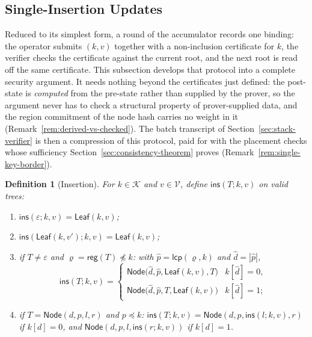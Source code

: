 \documentclass[11pt]{article}
\newtheorem{definition}{Definition}
\begin{document}
\subsection{Single-Insertion Updates}
\label{sec:single-key}

Reduced to its simplest form, a round of the accumulator records one binding: the operator submits $(k,v)$ together with a non-inclusion certificate for $k$, the verifier checks the certificate against the current root, and the next root is read off the same certificate. This subsection develops that protocol into a complete security argument. It needs nothing beyond the certificates just defined: the post-state is \emph{computed} from the pre-state rather than supplied by the prover, so the argument never has to check a structural property of prover-supplied data, and the region commitment of the node hash carries no weight in it (Remark~\ref{rem:derived-vs-checked}). The batch transcript of Section~\ref{sec:stack-verifier} is then a compression of this protocol, paid for with the placement checks whose sufficiency Section~\ref{sec:consistency-theorem} proves (Remark~\ref{rem:single-key-border}).

\begin{definition}[Insertion]
\label{def:insert}
For $k \in \mathcal{K}$ and $v \in \mathcal{V}$, define $\mathsf{ins}(T;k,v)$ on valid trees:
\begin{enumerate}[nosep,label=(\arabic*)]
  \item $\mathsf{ins}(\varepsilon;k,v) = \mathsf{Leaf}(k,v)$;
  \item $\mathsf{ins}(\mathsf{Leaf}(k,v');k,v) = \mathsf{Leaf}(k,v)$;
  \item if $T \neq \varepsilon$ and $\varrho = \mathsf{reg}(T) \not\preceq k$: with $\hat p = \mathsf{lcp}(\varrho,k)$ and $\hat d = |\hat p|$,
        \[
          \mathsf{ins}(T;k,v) =
          \begin{cases}
            \mathsf{Node}\bigl(\hat d,\hat p,\mathsf{Leaf}(k,v),T\bigr) & k[\hat d]=0,\\
            \mathsf{Node}\bigl(\hat d,\hat p,T,\mathsf{Leaf}(k,v)\bigr) & k[\hat d]=1;
          \end{cases}
        \]
  \item if $T = \mathsf{Node}(d,p,l,r)$ and $p \preceq k$: $\mathsf{ins}(T;k,v) = \mathsf{Node}(d,p,\mathsf{ins}(l;k,v),r)$ if $k[d]=0$, and $\mathsf{Node}(d,p,l,\mathsf{ins}(r;k,v))$ if $k[d]=1$.
\end{enumerate}
\end{definition}
\end{document}
